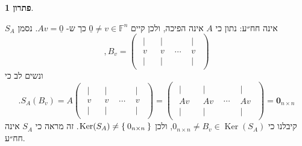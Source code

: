 \documentclass[12pt]{report}
\theoremstyle{plain}
\theoremstyle{definition}
\newtheorem*{solution}{פתרון}
\newcommand{\F}{\mathbb{F}}
\newcommand{\0}{\mathbf{0}}
\DeclareMathOperator{\Ker}{Ker}
\begin{document}
\begin{solution}
\begin{enumerate}[label=\alph*.]
$S_A$
אינה חח״ע: נתון כי
$A$
אינה הפיכה, ולכן קיים 
$\underline{0}\neq v\in\F^n$
כך ש-
$Av=\underline{0}$.
נסמן
$$
,B_v=\begin{pmatrix}
\begin{array}{c}
|\\[-0.4ex]
v\\[-0.4ex]
|
\end{array}
&
\begin{array}{c}
|\\[-0.4ex]
v\\[-0.4ex]
|
\end{array}
&
\cdots
&
\begin{array}{c}
|\\[-0.4ex]
v\\[-0.4ex]
|
\end{array}
\end{pmatrix}
$$
ונשים לב כי
$$
.S_A(B_v)=A\begin{pmatrix}
\begin{array}{c}
|\\[-0.4ex]
v\\[-0.4ex]
|
\end{array}
&
\begin{array}{c}
|\\[-0.4ex]
v\\[-0.4ex]
|
\end{array}
&
\cdots
&
\begin{array}{c}
|\\[-0.4ex]
v\\[-0.4ex]
|
\end{array}
\end{pmatrix}=\begin{pmatrix}
\begin{array}{c}
|\\[-0.4ex]
Av\\[-0.4ex]
|
\end{array}
&
\begin{array}{c}
|\\[-0.4ex]
Av\\[-0.4ex]
|
\end{array}
&
\cdots
&
\begin{array}{c}
|\\[-0.4ex]
Av\\[-0.4ex]
|
\end{array}
\end{pmatrix}=\0_{n\times n}
$$
קיבלנו כי
$0_{n\times n}\neq B_v\in\Ker(S_A)$,
ולכן
$\Ker(S_A)\neq \Set{0_{n\times n}}$.
זה מראה כי 
$S_A$
אינה חח״ע.


\end{enumerate}
\end{solution}
\end{document}
